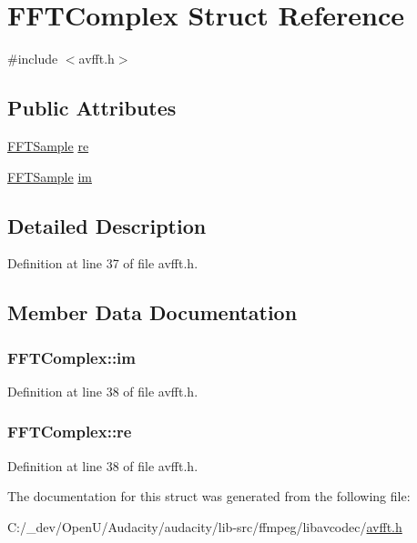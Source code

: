 \hypertarget{struct_f_f_t_complex}{}\section{F\+F\+T\+Complex Struct Reference}
\label{struct_f_f_t_complex}


{\ttfamily \#include $<$avfft.\+h$>$}

\subsection*{Public Attributes}
\begin{DoxyCompactItemize}
\item 
\hyperlink{group__lavc__fft_gaa306dc16df543b25d9910debc3f76b96}{F\+F\+T\+Sample} \hyperlink{struct_f_f_t_complex_a1fe3a8dd90a15a477065508b9319df6a}{re}
\item 
\hyperlink{group__lavc__fft_gaa306dc16df543b25d9910debc3f76b96}{F\+F\+T\+Sample} \hyperlink{struct_f_f_t_complex_a69b2491bd684836a7a9350dcbdbb886b}{im}
\end{DoxyCompactItemize}


\subsection{Detailed Description}


Definition at line 37 of file avfft.\+h.



\subsection{Member Data Documentation}
\subsubsection[{\texorpdfstring{im}{im}}]{ F\+F\+T\+Complex\+::im}\hypertarget{struct_f_f_t_complex_a69b2491bd684836a7a9350dcbdbb886b}{}\label{struct_f_f_t_complex_a69b2491bd684836a7a9350dcbdbb886b}


Definition at line 38 of file avfft.\+h.

\subsubsection[{\texorpdfstring{re}{re}}]{ F\+F\+T\+Complex\+::re}\hypertarget{struct_f_f_t_complex_a1fe3a8dd90a15a477065508b9319df6a}{}\label{struct_f_f_t_complex_a1fe3a8dd90a15a477065508b9319df6a}


Definition at line 38 of file avfft.\+h.



The documentation for this struct was generated from the following file\+:\begin{DoxyCompactItemize}
\item 
C\+:/\+\_\+dev/\+Open\+U/\+Audacity/audacity/lib-\/src/ffmpeg/libavcodec/\hyperlink{avfft_8h}{avfft.\+h}\end{DoxyCompactItemize}

